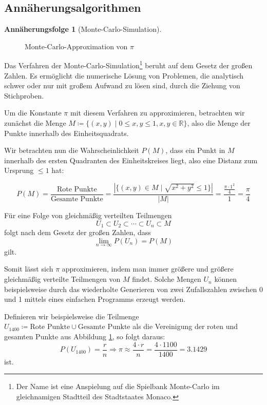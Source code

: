 \documentclass{scrartcl}
\theoremstyle{definition}
\newtheorem{approximation sequence}{Annäherungsfolge}
\begin{document}
\subsection{Annäherungsalgorithmen}

\begin{approximation sequence}[Monte-Carlo-Simulation]~\\[12pt]
\begin{figure}[H]
    \centering
    
    \caption{Monte-Carlo-Approximation von \(\pi\)}
    \label{fig:monte-carlo-approximation}
\end{figure}

Das Verfahren der Monte-Carlo-Simulation\footnote{Der Name ist eine Anspielung
auf die Spielbank Monte-Carlo im gleichnamigen Stadtteil des Stadtstaates
Monaco.\cite{anderson:1986:metropolis}} beruht auf dem Gesetz der großen
Zahlen. Es ermöglicht die numerische Lösung von Problemen, die analytisch
schwer oder nur mit großem Aufwand zu lösen sind, durch die Ziehung von
Stichproben.

Um die Konstante \(\pi\) mit diesem Verfahren zu approximieren, betrachten wir
zunächst die Menge \(M \coloneq \{(x, y) \mid 0 \le x,y \le 1, x, y \in
\mathbb{R}\}\), also die Menge der Punkte innerhalb des Einheitsquadrats.

Wir betrachten nun die Wahrscheinlichkeit \(P(M)\), dass ein Punkt in \(M\)
innerhalb des ersten Quadranten des Einheitskreises liegt, also eine Distanz
zum Ursprung \(\le 1\) hat:

\begin{equation}
    P(M) = \frac{\text{Rote Punkte}}{\text{Gesamte Punkte}} = \frac{|\{(x, y) \in M \mid \sqrt{x^2 + y^2} \le 1\}|}{|M|} = \frac{\frac{\pi \cdot 1^2}{4}}{1} = \frac{\pi}{4}
\end{equation}

Für eine Folge von gleichmäßig verteilten Teilmengen
\begin{equation}
    U_1 \subset U_2 \subset \cdots \subset U_n \subset M
\end{equation}
folgt nach dem Gesetz der großen Zahlen, dass
\begin{equation}
    \lim_{n \to \infty} P(U_n) = P(M)
\end{equation}
gilt.

Somit lässt sich \(\pi\) approximieren, indem man immer größere und größere
gleichmäßig verteilte Teilmengen von \(M\) findet. Solche Mengen \(U_n\) können
beispielsweise durch das wiederholte Generieren von zwei Zufallszahlen zwischen
0 und 1 mittels eines einfachen Programms erzeugt werden.

Definieren wir beispielsweise die Teilmenge \(U_{1400} \coloneq \text{Rote
Punkte} \cup \text{Gesamte Punkte}\) als die Vereinigung der roten und gesamten
Punkte aus Abbildung \ref{fig:monte-carlo-approximation}, so folgt daraus:
\begin{equation}
    P(U_{1400}) = \frac{r}{n} \Rightarrow \pi \approx \frac{4 \cdot r}{n} = \frac{4 \cdot 1100}{1400} = 3.1429
\end{equation}
ist.

\end{approximation sequence}
\end{document}
